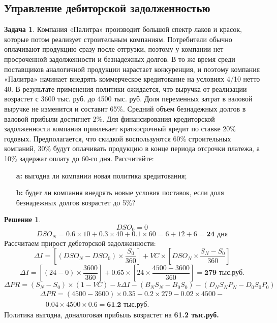 \documentclass[a4paper, 14pt]{article}
\theoremstyle{plain} %
\theoremstyle{definition} %
\newtheorem*{solution}{Решение}
\newtheorem{problem}{Задача}[subsection]
\theoremstyle{remark} %
\begin{document}
\subsection{Управление дебиторской задолженностью}

\begin{problem}
	Компания «Палитра» производит большой спектр лаков и красок, которые  потом  реализует  строительным  компаниям.  Потребители  обычно оплачивают  продукцию  сразу  после  отгрузки,  поэтому у  компании  нет просроченной  задолженности  и  безнадежных  долгов.  В  то  же  время  среди поставщиков аналогичной продукции нарастает конкуренция, и поэтому компания «Палитра» начинает внедрять коммерческое кредитование на условиях 4/10 нетто 40.  В  результате  применения  политики  ожидается,  что выручка  от  реализации возрастет с 3600 тыс. руб. до 4500 тыс. руб. Доля переменных затрат в валовой выручке  не  изменится  и  составит  65\%.  Средний  объем безнадежных  долгов  в валовой   прибыли   достигнет   2\%.   Для   финансирования   кредиторской задолженности  компания  привлекает  краткосрочный  кредит  по  ставке  20\% годовых.  Предполагается,  что  скидкой  воспользуются 60\%  строительных компаний, 30\% будут оплачивать продукцию в конце периода отсрочки платежа, а 10\% задержат оплату до 60-го дня. Рассчитайте:
	\begin{itemize}
		\item[\textbf{a:}] выгодна ли компании новая политика кредитования;
		\item[\textbf{b:}] будет ли компания  внедрять  новые  условия поставок, если  доля безнадежных долгов возрастет до 5\%?
	\end{itemize}
	\begin{solution}
		\[
			DSO_0 = 0
		\]
		\[
			DSO_N = 0.6 \times 10 + 0.3 \times 40 + 0.1 \times 60 = 6 + 12 + 6 = \textbf{24 дня}
		\]
		Рассчитаем прирост дебеторской задолженности:
		\[
			\Delta I = \left[(DSO_{N}-DSO_{0})\times \frac{S_{0}}{360}\right]+VC\times \left[DSO_{N}\times \frac{S_{N}-S_{0}}{360}\right]
		\]
		\[
			\Delta I = \left[(24-0)\times \frac{3600}{360}\right]+0.65\times \left[24\times \frac{4500-3600}{360}\right] = \textbf{279 тыс.руб.}
		\]
		\[
			\Delta PR = (S_{N} - S_{0})\times(1-VC) - k\Delta I - (B_{N}S_{N} - B_{0}S_{0}) - (D_{N}S_{N}P_{N} - D_{0}S_{0}P_{0})
		\]
		\begin{multline*}
			\Delta PR = (4500 - 3600)\times 0.35 - 0.2\times 279 - 0.02 \times 4500 - \\
			- 0.04 \times 4500 \times 0.6 = \textbf{61.2 тыс.руб.}
		\end{multline*}
		Политика выгодна, доналоговая прибыль возрастет на \textbf{61.2 тыс.руб.}
	\end{solution}
\end{problem}
\end{document}
